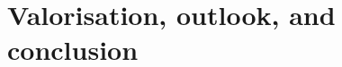 \renewcommand\thesection{\arabic{chapter}.\arabic{section}}
\setcounter{section}{0}
\renewcommand{\thefigure}{5.\arabic{figure}}
\setcounter{figure}{0}


\chapter{Valorisation, outlook, and conclusion}
\label{chap:5}






\printbibliography[title={References}]
